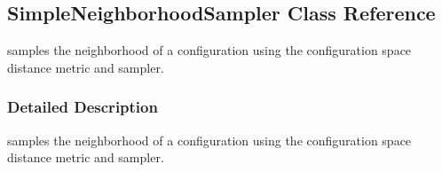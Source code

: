 \hypertarget{classOpenRAVE_1_1planningutils_1_1SimpleNeighborhoodSampler}{
\subsection{SimpleNeighborhoodSampler Class Reference}
\label{classOpenRAVE_1_1planningutils_1_1SimpleNeighborhoodSampler}
}


samples the neighborhood of a configuration using the configuration space distance metric and sampler.  




\subsubsection{Detailed Description}
samples the neighborhood of a configuration using the configuration space distance metric and sampler. 
